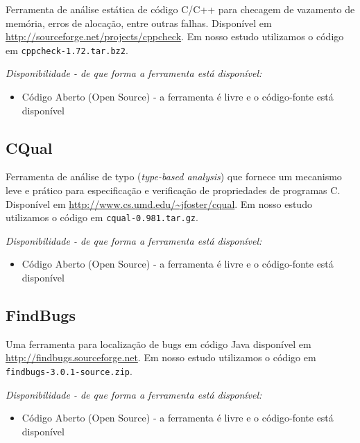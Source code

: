 Ferramenta de análise estática de código C/C++ para checagem de vazamento de
memória, erros de alocação, entre outras falhas. Disponível em
\url{http://sourceforge.net/projects/cppcheck}. Em nosso estudo utilizamos o
código em \texttt{cppcheck-1.72.tar.bz2}.

\begin{description}

  \item {\it Disponibilidade - de que forma a ferramenta está disponível:}
    \begin{itemize}
      \item Código Aberto (Open Source) - a ferramenta é livre e o código-fonte está disponível
    \end{itemize}

\end{description}

\subsection{CQual}

Ferramenta de análise de typo ({\it type-based analysis}) que fornece um
mecanismo leve e prático para especificação e verificação de propriedades de
programas C. Disponível em \url{http://www.cs.umd.edu/~jfoster/cqual}. Em
nosso estudo utilizamos o código em \texttt{cqual-0.981.tar.gz}.

\begin{description}

  \item {\it Disponibilidade - de que forma a ferramenta está disponível:}
    \begin{itemize}
      \item Código Aberto (Open Source) - a ferramenta é livre e o código-fonte está disponível
    \end{itemize}

\end{description}

\subsection{FindBugs}

Uma ferramenta para localização de bugs em código Java disponível em
\url{http://findbugs.sourceforge.net}. Em nosso estudo utilizamos o código em
\texttt{findbugs-3.0.1-source.zip}.

\begin{description}

  \item {\it Disponibilidade - de que forma a ferramenta está disponível:}
    \begin{itemize}
      \item Código Aberto (Open Source) - a ferramenta é livre e o código-fonte está disponível
    \end{itemize}

\end{description}

